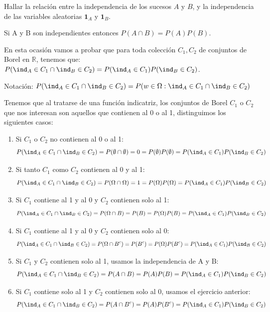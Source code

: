 \begin{problem}[2] Hallar la relaci\'on entre la independencia de los sucesos $A$ y $B$, y la independencia de las variables aleatorias $\mathbf{1}_A$ y $\mathbf{1}_B$.

\solution
Si A y B son independientes entonces $P(A \cap B) = P(A)P(B)$.

En esta ocasión vamos a probar que para toda colección $C_1,C_2$ de conjuntos de Borel en $\mathbb{R}$, tenemos que: $P(\ind_A \in C_1 \cap \ind_B \in C_2)=P(\ind_A \in C_1)P(\ind_B \in C_2)$. 

Notación: $P(\ind_A \in C_1 \cap \ind_B \in C_2) = P(w \in \Omega : \ind_A \in C_1 \cap \ind_B \in C_2)$

Tenemos que al tratarse de una función indicatriz, los conjuntos de Borel $C_1$ o $C_2$ que nos interesan son aquellos que contienen al 0 o al 1, distinguimos los siguientes casos:

\begin{enumerate}
\item Si $C_1$ o $C_2$ no contienen al 0 o al 1:
\[
P(\ind_A \in C_1 \cap \ind_B \in C_2) = P(\emptyset \cap \emptyset) = 0 = P(\emptyset) P(\emptyset) =P(\ind_A \in C_1)P(\ind_B \in C_2)
\]

\item Si tanto $C_1$ como $C_2$ contienen al 0 y al 1:
\[
P(\ind_A \in C_1 \cap \ind_B \in C_2) = P(\Omega \cap \Omega) = 1 = P(\Omega) P(\Omega) = P(\ind_A \in C_1)P(\ind_B \in C_2)
\]

\item Si $C_1$ contiene al 1 y al 0 y $C_2$ contienen solo al 1:
\[
P(\ind_A \in C_1 \cap \ind_B \in C_2) = P(\Omega \cap B) = P(B) = P(\Omega) P(B) = P(\ind_A \in C_1)P(\ind_B \in C_2)
\]


\item Si $C_1$ contiene al 1 y al 0 y $C_2$ contienen solo al 0:
\[
P(\ind_A \in C_1 \cap \ind_B \in C_2) = P(\Omega \cap B^c) = P(B^c) = P(\Omega) P(B^c) = P(\ind_A \in C_1)P(\ind_B \in C_2)
\]

\item Si $C_1$ y $C_2$ contienen solo al 1, usamos la independencia de A y B:
\[
P(\ind_A \in C_1 \cap \ind_B \in C_2) = P(A \cap B) = P(A)P(B) = P(\ind_A \in C_1)P(\ind_B \in C_2)
\]

\item Si $C_1$ contiene solo al 1 y $C_2$ contienen solo al 0, usamos el ejercicio anterior:
\[
P(\ind_A \in C_1 \cap \ind_B \in C_2) = P(A \cap B^c) = P(A)P(B^c) = P(\ind_A \in C_1)P(\ind_B \in C_2)
\]


\end{enumerate}
\end{problem}
